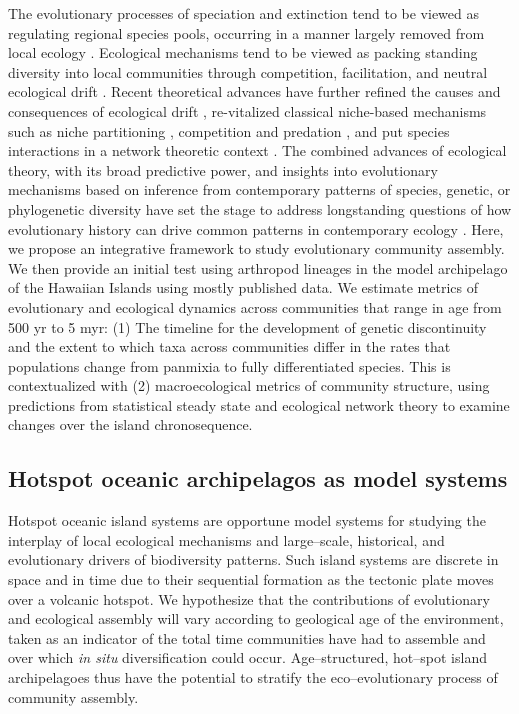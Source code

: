 \documentclass[12pt]{article}
\begin{document}
\begin{linenumbers}
The evolutionary processes of speciation and extinction tend to be
viewed as regulating regional species pools, occurring in a manner
largely removed from local ecology \citep{hubbell2001,
  cavenderBares2009, wiens2011}. Ecological mechanisms tend to be
viewed as packing standing diversity into local communities through
competition, facilitation, and neutral ecological drift
\citep{hubbell2001, tilman2004, Bascompte2007, chase2011,
  borer2014}. Recent theoretical advances have further refined the
causes and consequences of ecological drift \citep{hubbell2001,
  rosindell2011, rosindell2012}, re-vitalized classical niche-based
mechanisms such as niche partitioning \citep{tilman2004, chesson2000},
competition and predation \citep{borer2014}, and put species
interactions in a network theoretic context \citep{williams2000,
  brose2006, berlow2009}. The combined advances of ecological theory,
with its broad predictive power, and insights into evolutionary
mechanisms based on inference from contemporary patterns of species,
genetic, or phylogenetic diversity \citep[e.g.,][]{kreft2007,
  jetz2012, wiens2004, wiens2011} have set the stage to address
longstanding questions of how evolutionary history can drive common
patterns in contemporary ecology \citep{ricklefs1987}. Here, we
propose an integrative framework to study evolutionary community
assembly. We then provide an initial test using arthropod lineages in
the model archipelago of the Hawaiian Islands using mostly published
data.  We estimate metrics of evolutionary and ecological dynamics
across communities that range in age from 500 yr to 5 myr: (1) The
timeline for the development of genetic discontinuity and the extent
to which taxa across communities differ in the rates that populations
change from panmixia to fully differentiated species. This is
contextualized with (2) macroecological metrics of community
structure, using predictions from statistical steady state and
ecological network theory to examine changes over the island
chronosequence.

\subsection*{Hotspot oceanic archipelagos as model systems}

Hotspot oceanic island systems are opportune model systems for
studying the interplay of local ecological mechanisms and
large--scale, historical, and evolutionary drivers of biodiversity
patterns. Such island systems are discrete in space and in time due to
their sequential formation as the tectonic plate moves over a volcanic
hotspot.  We hypothesize that the contributions of evolutionary and
ecological assembly will vary according to geological age of the
environment, taken as an indicator of the total time communities have
had to assemble and over which {\it in situ} diversification could
occur.  Age--structured, hot--spot island archipelagoes thus have the
potential to stratify the eco--evolutionary process of community
assembly.


\end{linenumbers}
\end{document}
